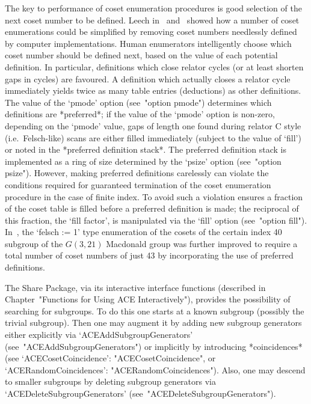 The key  to  performance  of  coset  enumeration  procedures  is  good
selection  of  the  next   coset   number   to   be   defined.   Leech
in~\cite{Lee77}  and~\cite{Lee84}  showed  how  a  number   of   coset
enumerations could be simplified by removing coset numbers  needlessly
defined by computer implementations. Human  enumerators  intelligently
choose which coset number should be defined next, based on  the  value
of each potential definition. In particular, definitions  which  close
relator cycles (or at least shorten gaps in cycles)  are  favoured.  A
definition which actually closes a relator  cycle  immediately  yields
twice as many table entries (deductions)  as  other  definitions.  The
value of the `pmode'  option  (see~"option  pmode")  determines  which
definitions are *preferred*; if the value of  the  `pmode'  option  is
non-zero, depending on the `pmode' value, gaps  of  length  one  found
during relator C style  (i.e.~Felsch-like)  scans  are  either  filled
immediately  (subject  to  the  value  of  `fill')  or  noted  in  the
*preferred  definition  stack*.  The  preferred  definition  stack  is
implemented as a  ring  of  size  determined  by  the  `psize'  option
(see~"option psize"). However, making preferred definitions carelessly
can violate the conditions required for guaranteed termination of  the
coset enumeration procedure in the case of finite index. To avoid such
a violation {\ACE} ensures a fraction of the  coset  table  is  filled
before  a  preferred  definition  is  made;  the  reciprocal  of  this
fraction, the `fill factor', is  manipulated  via  the  `fill'  option
(see~"option  fill").  In~\cite{Hav91},  the  `felsch   :=   1'   type
enumeration of the cosets of the certain  index  40  subgroup  of  the
$G(3,21)$ Macdonald group was further  improved  to  require  a  total
number of coset numbers  of  just  43  by  incorporating  the  use  of
preferred definitions.


The  {\ACE}  Share  Package,  via  its  interactive  {\ACE}  interface
functions   (described   in   Chapter~"Functions   for    Using    ACE
Interactively"), provides the possibility of searching for  subgroups.
To do this one starts  at  a  known  subgroup  (possibly  the  trivial
subgroup). Then one may augment it by adding new  subgroup  generators
either        explicitly        via         `ACEAddSubgroupGenerators'
(see~"ACEAddSubgroupGenerators")   or   implicitly   by    introducing
*coincidences* (see `ACECosetCoincidence':  "ACECosetCoincidence",  or
`ACERandomCoincidences':  "ACERandomCoincidences").  Also,   one   may
descend to smaller  subgroups  by  deleting  subgroup  generators  via
`ACEDeleteSubgroupGenerators' (see~"ACEDeleteSubgroupGenerators").

